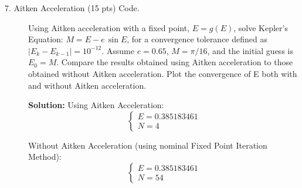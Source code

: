 \documentclass[12pt]{article}
\begin{document}
\begin{description}
\begin{enumerate}[label=\alph*.]
		\end{enumerate}
		\color{black}
		\fi
		
		\item[7. Aitken Acceleration (15 pts) Code.] Using Aitken acceleration with a fixed point, $E = g (E)$, solve Kepler's Equation: $M = E - e \, \sin E$, for a convergence tolerance defined as $|E_k - E_{k-1}| = 10^{-12}$. Assume $e = 0.65$, $M = \pi/16$, and the initial guess is $E_0 = M$. Compare the results obtained using Aitken acceleration to those obtained without Aitken acceleration. Plot the convergence of E both with and without Aitken acceleration.
		
		\ifsolution\color{red}
		\textbf{Solution:}
		Using Aitken Acceleration:
		\begin{equation*}
		\begin{cases}
		E = 0.385183461 \\
		N = 4
		\end{cases}
		\end{equation*}
		
		Without Aitken Acceleration (using nominal Fixed Point Iteration Method):
		\begin{equation*}
		\begin{cases}
		E = 0.385183461 \\
		N = 54
		\end{cases}
		\end{equation*}
		
		\fi	
		
	\end{description}
\end{document}

